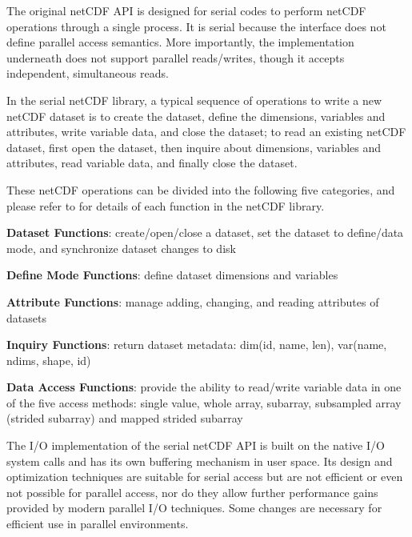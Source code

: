 \documentclass[10pt,twocolumn]{article}          %
\begin{document}
The original netCDF API is designed for serial codes to perform
netCDF operations through a single process. It is serial because
the interface does not define parallel access semantics. More
importantly, the implementation underneath does not support
parallel reads/writes, though it accepts independent, simultaneous
reads.

In the serial netCDF library, a typical sequence of operations to write a new netCDF dataset is to
create the dataset, define the dimensions, variables and attributes, write variable data, and close
the dataset; to read an existing netCDF dataset, first open the dataset, then inquire about
dimensions, variables and attributes, read variable data, and finally close the dataset.

These netCDF operations can be divided into the following five categories, and please refer to
\cite{RDED97} for details of each function in the netCDF library.


\begin{list}{()}{\setlength{\rightmargin}{\leftmargin}}
\item \textbf{Dataset Functions}: create/open/close a dataset, set the dataset to define/data mode, and synchronize dataset
changes to disk
\item \textbf{Define Mode Functions}: define dataset dimensions and variables
\item \textbf{Attribute Functions}: manage adding, changing, and reading attributes of datasets
\item \textbf{Inquiry Functions}: return dataset metadata: dim(id, name, len), var(name, ndims, shape, id)
\item \textbf{Data Access Functions}: provide the ability to read/write variable data in one of the five access methods: single value, whole array,
subarray, subsampled array (strided subarray) and mapped strided subarray
\end{list}

The I/O implementation of the serial netCDF API is built on the native I/O system calls and has its
own buffering mechanism in user space. Its design and optimization techniques are suitable for
serial access but are not efficient or even not possible for parallel access, nor do they allow
further performance gains provided by modern parallel I/O techniques. Some changes are necessary
for efficient use in parallel environments.

\end{document}
